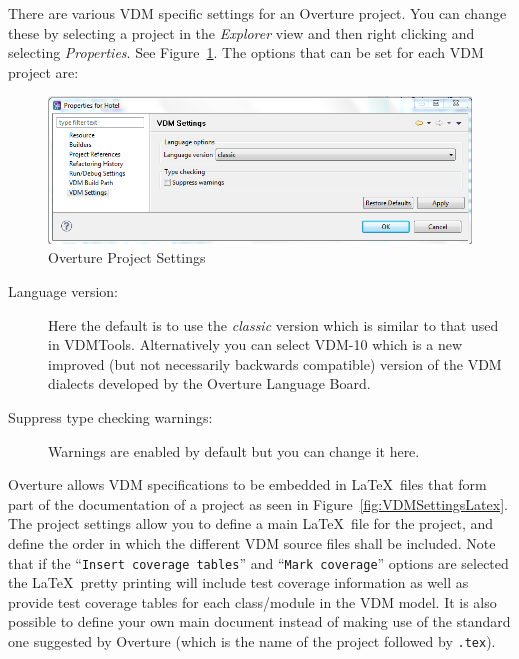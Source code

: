 \documentclass{overturerepchap}
\begin{document}
There are various VDM
specific settings for an Overture project. You can change these by
selecting a project
in the \emph{Explorer} view and then right clicking and selecting
\emph{Properties}. See Figure~\ref{fig:VDMSettings}. The options 
that can be set for each VDM project are:

\begin{figure}[!hbt]
\begin{center}
  \includegraphics[width=\textwidth]{screendumps/projectsettings}
  \caption[Overture Project Settings]{Overture Project Settings}
  \label{fig:VDMSettings}
\end{center}
\end{figure}

\begin{description}
\item[Language version:] Here the default is to use the
  \emph{classic} version which is similar to that used in
  VDMTools. Alternatively you can select VDM-10 which
  is a new improved (but not necessarily backwards compatible) version of
  the VDM dialects developed by the Overture Language Board. 
\item[Suppress type checking warnings:] Warnings are enabled
  by default but you can change it here.
\end{description}

Overture allows VDM specifications to be embedded in \LaTeX\ files that
form part of the documentation of a project as seen in
Figure~\ref{fig:VDMSettingsLatex}. The project settings allow you
to define a main \LaTeX\ file for the project, and define the order in which the
different VDM source files shall be included. Note that if the
``\texttt{Insert coverage tables}'' and ``\texttt{Mark coverage}''
options are selected the \LaTeX\ pretty printing will include test
coverage information as well as provide test coverage tables for each
class/module in the VDM model. It is also possible to define your own
main document instead of making use of the standard one suggested by
Overture (which is the name of the project followed by \texttt{.tex}).
\end{document}
